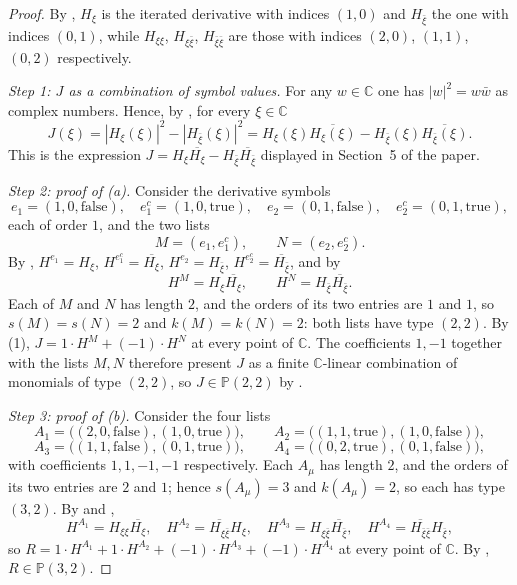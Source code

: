 \begin{proof}
By , $H_\xi$ is the iterated derivative with indices
$(1,0)$ and $H_{\bar\xi}$ the one with indices $(0,1)$, while $H_{\xi\xi}$,
$H_{\xi\bar\xi}$, $H_{\bar\xi\bar\xi}$ are those with indices $(2,0)$,
$(1,1)$, $(0,2)$ respectively.

\emph{Step 1: $J$ as a combination of symbol values.}  For any
$w\in\mathbb{C}$ one has $|w|^2=w\bar w$ as complex numbers.  Hence, by
, for every $\xi\in\mathbb{C}$
\begin{equation}\tag{1}
  J(\xi)=|H_\xi(\xi)|^2-|H_{\bar\xi}(\xi)|^2
  =H_\xi(\xi)\overline{H_\xi(\xi)}-H_{\bar\xi}(\xi)\overline{H_{\bar\xi}(\xi)} .
\end{equation}
This is the expression $J=H_\xi\overline{H_\xi}-H_{\bar\xi}\overline{H_{\bar\xi}}$
displayed in Section~5 of the paper.

\emph{Step 2: proof of (a).}  Consider the derivative symbols
\[
  e_1=(1,0,\text{false}),\quad e_1^{c}=(1,0,\text{true}),\quad
  e_2=(0,1,\text{false}),\quad e_2^{c}=(0,1,\text{true}),
\]
each of order $1$, and the two lists
\[
  M=(e_1,e_1^{c}),\qquad N=(e_2,e_2^{c}).
\]
By , $H^{e_1}=H_\xi$, $H^{e_1^{c}}=\overline{H_\xi}$,
$H^{e_2}=H_{\bar\xi}$, $H^{e_2^{c}}=\overline{H_{\bar\xi}}$, and by
\[
  H^{M}=H_\xi\overline{H_\xi},\qquad H^{N}=H_{\bar\xi}\overline{H_{\bar\xi}} .
\]
Each of $M$ and $N$ has length $2$, and the orders of its two entries are $1$
and $1$, so $s(M)=s(N)=2$ and $k(M)=k(N)=2$: both lists have type $(2,2)$.  By
(1), $J=1\cdot H^{M}+(-1)\cdot H^{N}$ at every point of $\mathbb{C}$.  The
coefficients $1,-1$ together with the lists $M,N$ therefore present $J$ as a
finite $\mathbb{C}$-linear combination of monomials of type $(2,2)$, so
$J\in\mathbb{P}(2,2)$ by .

\emph{Step 3: proof of (b).}  Consider the four lists
\[
  A_1=\bigl((2,0,\text{false}),(1,0,\text{true})\bigr),\qquad
  A_2=\bigl((1,1,\text{true}),(1,0,\text{false})\bigr),
\]
\[
  A_3=\bigl((1,1,\text{false}),(0,1,\text{true})\bigr),\qquad
  A_4=\bigl((0,2,\text{true}),(0,1,\text{false})\bigr),
\]
with coefficients $1,1,-1,-1$ respectively.  Each $A_\mu$ has length $2$, and
the orders of its two entries are $2$ and $1$; hence $s(A_\mu)=3$ and
$k(A_\mu)=2$, so each has type $(3,2)$.  By  and
,
\[
  H^{A_1}=H_{\xi\xi}\overline{H_\xi},\quad
  H^{A_2}=\overline{H_{\xi\bar\xi}}H_\xi,\quad
  H^{A_3}=H_{\xi\bar\xi}\overline{H_{\bar\xi}},\quad
  H^{A_4}=\overline{H_{\bar\xi\bar\xi}}H_{\bar\xi},
\]
so $R=1\cdot H^{A_1}+1\cdot H^{A_2}+(-1)\cdot H^{A_3}+(-1)\cdot H^{A_4}$ at
every point of $\mathbb{C}$.  By , $R\in\mathbb{P}(3,2)$.


\end{proof}
